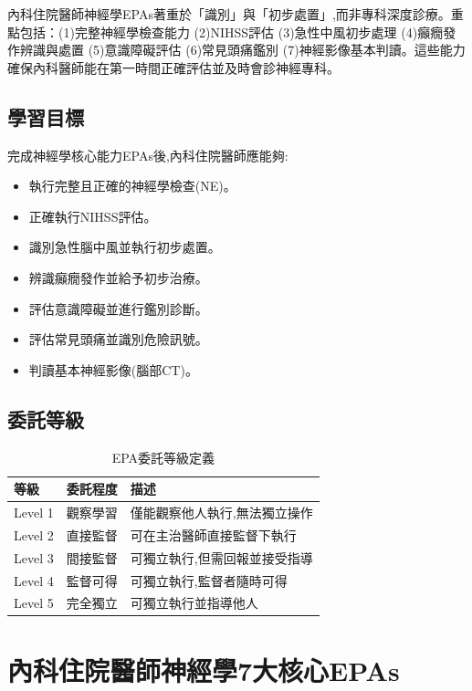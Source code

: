 \documentclass[12pt,a4paper]{article}
\newcommand{\note}[1]{
    \par
    \noindent
    \begin{tcolorbox}[
        colback=neuro_silver!5!white,
        colframe=neuro_silver,
        title=\textbf{重點提醒},
        fonttitle=\bfseries,
        boxrule=0.5pt,
        arc=3pt,
        left=6pt,
        right=6pt,
        top=6pt,
        bottom=6pt
    ]
    #1
    \end{tcolorbox}
}
\begin{document}
\vspace{0.5cm}
\note{
內科住院醫師神經學EPAs著重於「識別」與「初步處置」,而非專科深度診療。重點包括：(1)完整神經學檢查能力 (2)NIHSS評估 (3)急性中風初步處理 (4)癲癇發作辨識與處置 (5)意識障礙評估 (6)常見頭痛鑑別 (7)神經影像基本判讀。這些能力確保內科醫師能在第一時間正確評估並及時會診神經專科。
}

\subsection{學習目標}
完成神經學核心能力EPAs後,內科住院醫師應能夠:
\begin{itemize}[nosep]
    \item 執行完整且正確的神經學檢查(NE)。
    \item 正確執行NIHSS評估。
    \item 識別急性腦中風並執行初步處置。
    \item 辨識癲癇發作並給予初步治療。
    \item 評估意識障礙並進行鑑別診斷。
    \item 評估常見頭痛並識別危險訊號。
    \item 判讀基本神經影像(腦部CT)。
\end{itemize}

\subsection{委託等級}
\begin{table}[h]
    \centering
    \caption{EPA委託等級定義}
    \begin{tabular}{p{2cm} p{3cm} p{9cm}}
        \toprule
        \textbf{等級} & \textbf{委託程度} & \textbf{描述} \\
        \midrule
        Level 1 & 觀察學習 & 僅能觀察他人執行,無法獨立操作 \\
        Level 2 & 直接監督 & 可在主治醫師直接監督下執行 \\
        Level 3 & 間接監督 & 可獨立執行,但需回報並接受指導 \\
        Level 4 & 監督可得 & 可獨立執行,監督者隨時可得 \\
        Level 5 & 完全獨立 & 可獨立執行並指導他人 \\
        \bottomrule
    \end{tabular}
\end{table}

\newpage
\section{內科住院醫師神經學7大核心EPAs}
\end{document}
